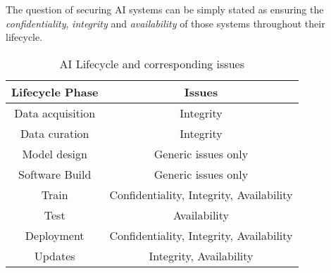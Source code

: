 The question of securing AI systems can be simply stated as ensuring the \textit{confidentiality}, \textit{integrity} and \textit{availability} of those systems throughout their lifecycle.
\begin{table}[htbp]
   \centering
   \begin{tabular}{|c|c|}
      \toprule
      \textbf{Lifecycle Phase} & \textbf{Issues}\\
      \hline
      Data acquisition & Integrity\\
      \hline
      Data curation & Integrity\\
      \hline
      Model design & Generic issues only \\
      \hline
      Software Build & Generic issues only\\
      \hline
      Train & Confidentiality, Integrity, Availability\\
      \hline
      Test & Availability\\
      \hline
      Deployment & Confidentiality, Integrity, Availability\\
      \hline
      Updates & Integrity, Availability\\
      \hline
   \end{tabular}
   \caption{AI Lifecycle and corresponding issues}
   \label{tab:ailifecycle_issues}
\end{table}